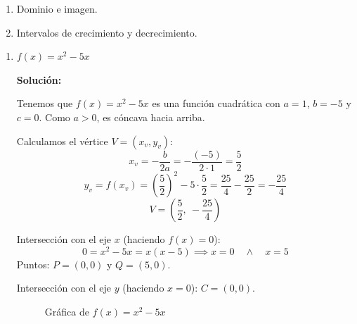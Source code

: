 \documentclass[12pt]{article}
\begin{document}
\begin{enumerate}[label=\roman*.]
    \item Dominio e imagen.
    \item Intervalos de crecimiento y decrecimiento.
\end{enumerate}
 
\begin{enumerate}[label=\alph*.-]
    \item $f(x) = x^2 - 5x$
    
    \textbf{Solución:}
    
    Tenemos que $f(x) = x^2 - 5x$ es una función cuadrática con $a = 1$, $b = -5$ y $c = 0$. Como $a > 0$, es cóncava hacia arriba.
    
    Calculamos el vértice $V = (x_v, y_v)$:
    \[
    x_v = -\frac{b}{2a} = -\frac{(-5)}{2 \cdot 1} = \frac{5}{2}
    \]
    \[
    y_v = f(x_v) = \left(\frac{5}{2}\right)^2 - 5 \cdot \frac{5}{2} = \frac{25}{4} - \frac{25}{2} = -\frac{25}{4}
    \]
    \[
    V = \left(\frac{5}{2},\ -\frac{25}{4}\right)
    \]
 
    Intersección con el eje $x$ (haciendo $f(x) = 0$):
    \[
    0 = x^2 - 5x = x(x - 5) \implies x = 0 \quad \land \quad x = 5
    \]
    Puntos: $P = (0, 0)$ y $Q = (5, 0)$.
 
    Intersección con el eje $y$ (haciendo $x = 0$): $C = (0, 0)$.
 
    \begin{figure}[H]
        \centering
        \caption{Gráfica de $f(x) = x^2 - 5x$}
    \end{figure}
 

\end{enumerate}
\end{document}
